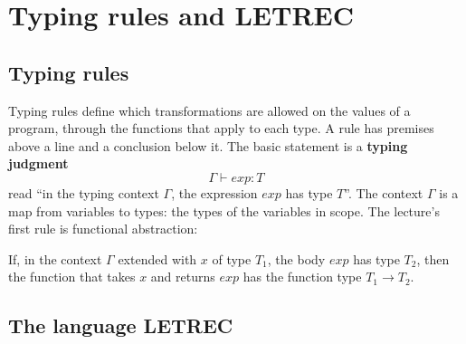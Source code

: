 \section{Typing rules and LETREC}
\label{sec:letrec}

\subsection{Typing rules}

Typing rules define which transformations are allowed on the values of a
program, through the functions that apply to each type. A rule has
premises above a line and a conclusion below it. The basic statement is a
\textbf{typing judgment}
\[
\Gamma \vdash \mathit{exp} : T
\]
read ``in the typing context $\Gamma$, the expression $\mathit{exp}$ has type
$T$''. The context $\Gamma$ is a map from variables to types: the types of the
variables in scope. The lecture's first rule is functional abstraction:
\begin{mathpar}
\end{mathpar}
If, in the context $\Gamma$ extended with $x$ of type $T_1$, the body
$\mathit{exp}$ has type $T_2$, then the function that takes $x$ and returns
$\mathit{exp}$ has the function type $T_1 \to T_2$.

\subsection{The language LETREC}

